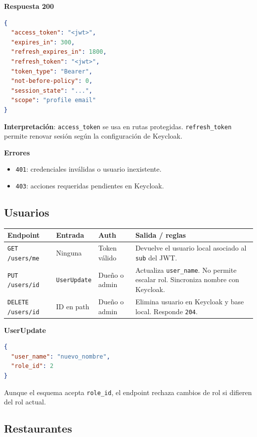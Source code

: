 \documentclass[12pt,letterpaper]{article}
\def\endpoint#1#2{\texttt{#1 #2}}
\def\codefile#1{\nolinkurl{#1}}
\begin{document}
\textbf{Respuesta 200}
\begin{lstlisting}[language=json]
{
  "access_token": "<jwt>",
  "expires_in": 300,
  "refresh_expires_in": 1800,
  "refresh_token": "<jwt>",
  "token_type": "Bearer",
  "not-before-policy": 0,
  "session_state": "...",
  "scope": "profile email"
}
\end{lstlisting}

\textbf{Interpretación}: \codefile{access\_token} se usa en rutas protegidas. \codefile{refresh\_token} permite renovar sesión según la configuración de Keycloak.

\textbf{Errores}
\begin{itemize}
    \item \codefile{401}: credenciales inválidas o usuario inexistente.
    \item \codefile{403}: acciones requeridas pendientes en Keycloak.
\end{itemize}

\subsection{Usuarios}

\begin{longtable}{p{}p{}p{}p{}}
\toprule
\textbf{Endpoint} & \textbf{Entrada} & \textbf{Auth} & \textbf{Salida / reglas}\\
\midrule
\endpoint{GET}{/users/me} & Ninguna & Token válido & Devuelve el usuario local asociado al \codefile{sub} del JWT.\\
\endpoint{PUT}{/users/{id}} & \codefile{UserUpdate} & Dueño o admin & Actualiza \codefile{user\_name}. No permite escalar rol. Sincroniza nombre con Keycloak.\\
\endpoint{DELETE}{/users/{id}} & ID en path & Dueño o admin & Elimina usuario en Keycloak y base local. Responde \codefile{204}.\\
\bottomrule
\end{longtable}

\textbf{UserUpdate}
\begin{lstlisting}[language=json]
{
  "user_name": "nuevo_nombre",
  "role_id": 2
}
\end{lstlisting}

Aunque el esquema acepta \codefile{role\_id}, el endpoint rechaza cambios de rol si difieren del rol actual.

\subsection{Restaurantes}
\end{document}
